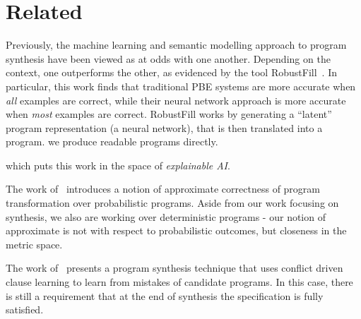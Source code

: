 

\section{Related}

Previously, the machine learning and semantic modelling approach to program synthesis have been viewed as at odds with one another.
Depending on the context, one outperforms the other, as evidenced by the tool RobustFill~\cite{devlin2017robustfill}.
In particular, this work finds that traditional PBE systems are more accurate when \textit{all} examples are correct, while their neural network approach is more accurate when \textit{most} examples are correct.
RobustFill works by generating a ``latent'' program representation (a neural network), that is then translated into a program.
we produce readable programs directly. 


which puts this work in the space of \textit{explainable AI}.

The work of~\cite{misailovic2011probabilistically} introduces a notion of approximate correctness of program transformation over probabilistic programs.
Aside from our work focusing on synthesis, we also are working over deterministic programs - our notion of approximate is not with respect to probabilistic outcomes, but closeness in the metric space.

The work of~\cite{Feng2018} presents a program synthesis technique that uses conflict driven clause learning to learn from mistakes of candidate programs.
In this case, there is still a requirement that at the end of synthesis the specification is fully satisfied.

